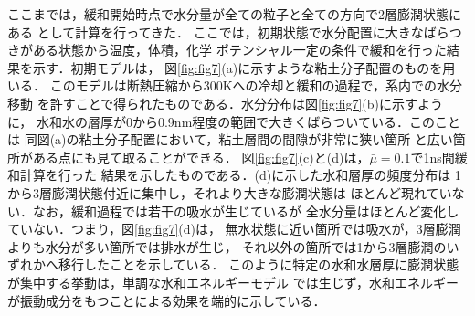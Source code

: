 ここまでは，緩和開始時点で水分量が全ての粒子と全ての方向で2層膨潤状態にある
として計算を行ってきた．
ここでは，初期状態で水分配置に大きなばらつきがある状態から温度，体積，化学
ポテンシャル一定の条件で緩和を行った結果を示す．初期モデルは，
図\ref{fig:fig7}(a)に示すような粘土分子配置のものを用いる．
このモデルは断熱圧縮から300Kへの冷却と緩和の過程で，系内での水分移動
を許すことで得られたものである．水分分布は図\ref{fig:fig7}(b)に示すように，
水和水の層厚が0から0.9nm程度の範囲で大きくばらついている．このことは
同図(a)の粘土分子配置において，粘土層間の間隙が非常に狭い箇所
と広い箇所がある点にも見て取ることができる．
図\ref{fig:fig7}(c)と(d)は，$\bar{\mu}=0.1$で1ns間緩和計算を行った
結果を示したものである．(d)に示した水和層厚の頻度分布は
1から3層膨潤状態付近に集中し，それより大きな膨潤状態は
ほとんど現れていない．なお，緩和過程では若干の吸水が生じているが
全水分量はほとんど変化していない．つまり，図\ref{fig:fig7}(d)は，
無水状態に近い箇所では吸水が，3層膨潤よりも水分が多い箇所では排水が生じ，
それ以外の箇所では1から3層膨潤のいずれかへ移行したことを示している．
このように特定の水和水層厚に膨潤状態が集中する挙動は，単調な水和エネルギーモデル
では生じず，水和エネルギーが振動成分をもつことによる効果を端的に示している．
